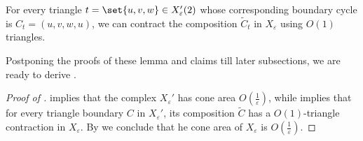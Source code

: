 \begin{claim}\label{claim:contract-X'(2)}
    For every triangle \(t=\set{u,v,w} \in X_\varepsilon'(2)\) whose corresponding boundary cycle is \(C_t=(u,v,w,u)\), we can contract the composition \(\tilde{C}_t\) in $X_\varepsilon$ using \(O(1)\) triangles.
\end{claim}

Postponing the proofs of these lemma and claims till later subsections, we are ready to derive . 

\begin{proof}[Proof of ]
     implies that the complex $X_\varepsilon'$ has cone area $O(\frac{1}{\varepsilon})$, while  implies that for every triangle boundary $C$ in $X_\varepsilon'$, its composition $\tilde{C}$ has a $O(1)$-triangle contraction in $X_\varepsilon$. By   we conclude that he cone area of $X_\varepsilon$ is $O(\frac{1}{\varepsilon})$.
\end{proof}




%

